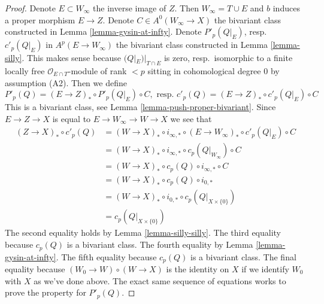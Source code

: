 \documentclass[10pt,a4paper]{amsart}
\theoremstyle{plain}
\theoremstyle{definition}
\theoremstyle{remark}
\numberwithin{equation}{subsection}
\begin{document}
\begin{proof}
Denote $E \subset W_\infty$ the inverse image of $Z$. Then
$W_\infty = T \cup E$ and $b$ induces a proper morphism $E \to Z$.
Denote $C \in A^0(W_\infty \to X)$ the bivariant class constructed
in Lemma \ref{lemma-gysin-at-infty}. Denote $P'_p(Q|_E)$, resp.\ $c'_p(Q|_E)$
in $A^p(E \to W_\infty)$ the bivariant class constructed
in Lemma \ref{lemma-silly}. This makes sense because
$(Q|_E)|_{T \cap E}$ is zero, resp.\ isomorphic to a finite locally free
$\mathcal{O}_{E \cap T}$-module of rank $< p$ sitting in
cohomological degree $0$ by assumption (A2). Then we define
$$
P'_p(Q) = (E \to Z)_* \circ P'_p(Q|_E) \circ C,\text{ resp. }
c'_p(Q) = (E \to Z)_* \circ c'_p(Q|_E) \circ C
$$
This is a bivariant class, see Lemma \ref{lemma-push-proper-bivariant}.
Since $E \to Z \to X$ is equal to $E \to W_\infty \to W \to X$ we see that
\begin{align*}
(Z \to X)_* \circ c'_p(Q)
& =
(W \to X)_* \circ i_{\infty, *} \circ (E \to W_\infty)_*
\circ c'_p(Q|_E) \circ C \\
& =
(W \to X)_* \circ i_{\infty, *} \circ c_p(Q|_{W_\infty}) \circ C \\
& =
(W \to X)_* \circ c_p(Q) \circ i_{\infty, *} \circ C \\
& =
(W \to X)_*\circ c_p(Q) \circ i_{0, *} \\
& =
(W \to X)_* \circ i_{0, *} \circ c_p(Q|_{X \times \{0\}}) \\
& =
c_p(Q|_{X \times \{0\}})
\end{align*}
The second equality holds by Lemma \ref{lemma-silly-silly}.
The third equality because $c_p(Q)$ is a bivariant class.
The fourth equality by Lemma \ref{lemma-gysin-at-infty}.
The fifth equality because $c_p(Q)$ is a bivariant class.
The final equality because $(W_0 \to W) \circ (W \to X)$
is the identity on $X$ if we identify $W_0$ with $X$ as we've
done above. The exact same sequence of equations works to
prove the property for $P'_p(Q)$.
\end{proof}
\end{document}
